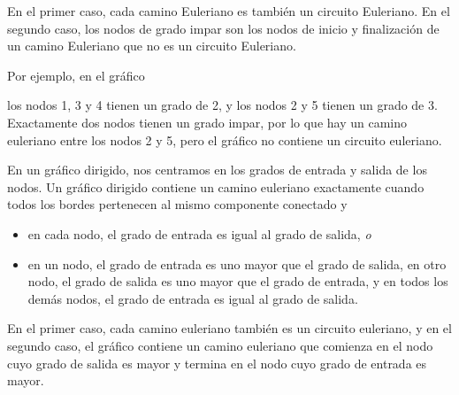 En el primer caso, cada camino Euleriano es también un circuito Euleriano.
En el segundo caso, los nodos de grado impar son los nodos de inicio
y finalización de un camino Euleriano que no es un circuito Euleriano.
\begin{samepage}
Por ejemplo, en el gráfico
\begin{center}
\end{center}
\end{samepage}
los nodos 1, 3 y 4 tienen un grado de 2,
y los nodos 2 y 5 tienen un grado de 3.
Exactamente dos nodos tienen un grado impar,
por lo que hay un camino euleriano entre los nodos 2 y 5,
pero el gráfico no contiene un circuito euleriano.

En un gráfico dirigido,
nos centramos en los grados de entrada y salida
de los nodos.
Un gráfico dirigido contiene un camino euleriano
exactamente cuando todos los bordes pertenecen al mismo
componente conectado y
\begin{itemize}
\item en cada nodo, el grado de entrada es igual al grado de salida, \emph{o}
\item en un nodo, el grado de entrada es uno mayor que el grado de salida,
en otro nodo, el grado de salida es uno mayor que el grado de entrada,
y en todos los demás nodos, el grado de entrada es igual al grado de salida.
\end{itemize}

En el primer caso, cada camino euleriano
también es un circuito euleriano,
y en el segundo caso, el gráfico contiene un camino euleriano
que comienza en el nodo cuyo grado de salida es mayor
y termina en el nodo cuyo grado de entrada es mayor.

